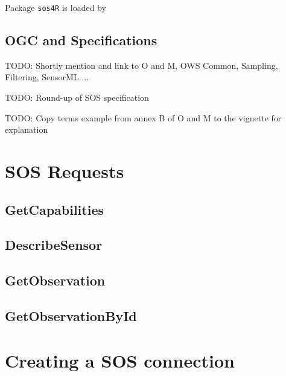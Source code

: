 \documentclass{article}
\begin{document}
Package {\tt sos4R} is loaded by 


\subsection{OGC and Specifications}

TODO: Shortly mention and link to O and M, OWS Common, Sampling, Filtering, SensorML ...

TODO: Round-up of SOS specification

TODO: Copy terms example from annex B of O and M to the vignette for explanation

\section{SOS Requests}

\subsection{GetCapabilities}


\subsection{DescribeSensor}


\subsection{GetObservation}


\subsection{GetObservationById}

\section{Creating a SOS connection}

\end{document}
